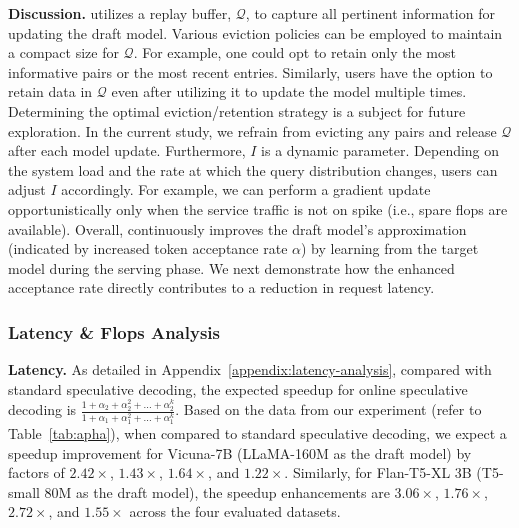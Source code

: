 {\bf Discussion.} 
\tool utilizes a replay buffer, $\mathcal{Q}$, to capture all pertinent information for updating the draft model. 
Various eviction policies can be employed to maintain a compact size for $\mathcal{Q}$. 
For example, one could opt to retain only the most informative pairs or the most recent entries. 
Similarly, users have the option to retain data in $\mathcal{Q}$
even after utilizing it to update the model multiple times.
Determining the optimal eviction/retention strategy is a subject for future exploration. 
In the current study, we refrain from evicting any pairs and release $\mathcal{Q}$ after each model update.
Furthermore, $I$ is a dynamic parameter. Depending on the system load and the rate at which the query
distribution changes, users can adjust $I$ accordingly.
For example, we can perform a gradient update opportunistically only when the service traffic is not on spike (i.e., spare flops are available).
Overall, \tool continuously improves the draft model's approximation (indicated by increased token acceptance rate $\alpha$) 
by learning from the target model during the serving phase. We next demonstrate how the enhanced acceptance rate directly 
contributes to a reduction in request latency.





\subsubsection{Latency \& Flops Analysis} 
\label{sec:analysis}
{\bf Latency.} As detailed in  Appendix~\ref{appendix:latency-analysis}, compared with standard speculative decoding, 
the expected speedup for online speculative decoding is  \( \frac{1+\alpha_2+\alpha_2^2+...+\alpha_2^{k}}{1+\alpha_1+\alpha_1^2+...+\alpha_1^k}\).
Based on the data from our experiment (refer to Table~\ref{tab:apha}), when compared to standard speculative decoding, 
we expect a speedup %
improvement for Vicuna-7B (LLaMA-160M as the draft model) by factors of \(2.42\times\), \(1.43\times\), \(1.64\times\), and \(1.22\times\). Similarly, for Flan-T5-XL 3B (T5-small 80M as the draft model), the speedup enhancements are \(3.06\times\), \(1.76\times\), \(2.72\times\), and \(1.55\times\) across the four evaluated datasets. %

